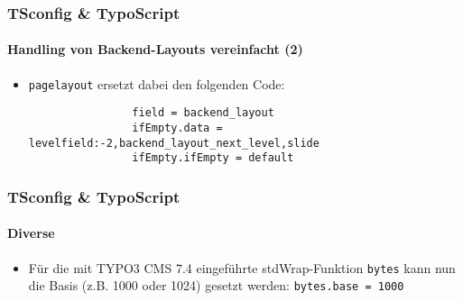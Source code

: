 \begin{frame}[fragile]
	\frametitle{TSconfig \& TypoScript}
	\framesubtitle{Handling von Backend-Layouts vereinfacht (2)}

	\lstset{basicstyle=\tiny\ttfamily}

	\begin{itemize}

		\item \texttt{pagelayout} ersetzt dabei den folgenden Code:

			\begin{lstlisting}
				field = backend_layout
				ifEmpty.data = levelfield:-2,backend_layout_next_level,slide
				ifEmpty.ifEmpty = default
			\end{lstlisting}

	\end{itemize}

\end{frame}

\begin{frame}[fragile]
	\frametitle{TSconfig \& TypoScript}
	\framesubtitle{Diverse}

	\begin{itemize}

		\item Für die mit TYPO3 CMS 7.4 eingeführte stdWrap-Funktion \texttt{bytes}
			kann nun die Basis (z.B. 1000 oder 1024) gesetzt werden:\newline
			\texttt{bytes.base = 1000}

	\end{itemize}

\end{frame}

